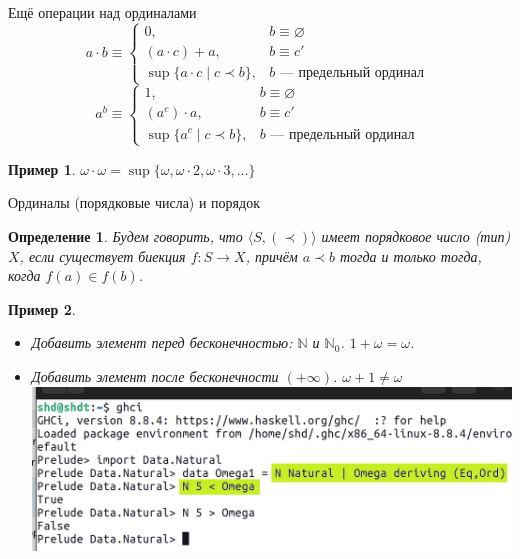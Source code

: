 \documentclass[aspectratio=169]{beamer}
\newtheorem{dfn}{Определение}[section]
\newtheorem{exm}{Пример}[section]
\begin{document}
\begin{frame}{Ещё операции над ординалами}
$$a \cdot b \equiv \left\{ \begin{array}{rl} 
   0, & b \equiv \varnothing\\
   (a \cdot c) + a, & b \equiv c'\\
   \sup \{ a \cdot c \mid c \prec b \}, &\mbox{$b$ --- предельный ординал }\end{array}\right.$$
\pause
$$a ^ b \equiv \left\{ \begin{array}{rl} 
   1, & b \equiv \varnothing\\
   (a ^ c) \cdot a, & b \equiv c'\\
   \sup \{ a^c \mid c \prec b \}, &\mbox{$b$ --- предельный ординал }\end{array}\right.$$
\pause
\begin{exm}$\omega \cdot \omega = \sup\{\omega,\omega\cdot 2, \omega\cdot 3, \dots\}$\end{exm}
\end{frame}

\begin{frame}{Ординалы (порядковые числа) и порядок}
\begin{dfn}Будем говорить, что $\langle S, (\prec)\rangle$ имеет порядковое число (тип) $X$, если существует биекция
$f: S \rightarrow X$, причём $a \prec b$ тогда и только тогда, когда $f(a) \in f(b)$.\end{dfn}
\begin{exm}\begin{itemize}
\item Добавить элемент перед бесконечностью: $\mathbb{N}$ и $\mathbb{N}_0$.
\pause
$1 + \omega = \omega$. \pause
\item Добавить элемент после бесконечности $(+\infty)$. \pause $\omega + 1 \ne \omega$ \pause
\includegraphics[scale=0.9]{lection-10-ghc}
\end{itemize}\end{exm} 
\end{frame}
\end{document}
